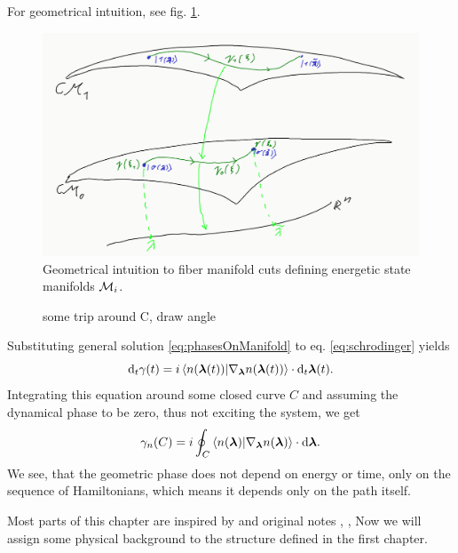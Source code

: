 For geometrical intuition, see fig. \ref{fig:manifoldCutIntuition}.

\begin{figure}[h]
    \centering
    \includegraphics[width=\textwidth]{../img/manifoldCutIntuition.png}
\caption{Geometrical intuition to fiber manifold cuts defining energetic state manifolds $\mathcal{M}_i$.}
    \label{fig:manifoldCutIntuition}
\end{figure}




\begin{figure}[h]
    \centering
\caption{some trip around C, draw angle}
    \label{fig:parallelTransportClosed}
\end{figure}

Substituting general solution \ref{eq:phasesOnManifold} to eq. \ref{eq:schrodinger} yields
\begin{equation}
    \mathrm{d}_t \gamma(t)=i\braket{n({\bm\lambda}(t))|\nabla_{\bm\lambda} n({\bm\lambda}(t))}\cdot \mathrm{d}_t {\bm\lambda}(t).
\end{equation}
Integrating this equation around some closed curve $C$ and assuming the dynamical phase to be zero, thus not exciting the system, we get
\begin{equation}
    \gamma_n(C)=i\oint_C\braket{n({\bm\lambda})|\nabla_{\bm\lambda} n({\bm\lambda})}\cdot \mathrm{d} {\bm\lambda}.
    \label{eq:gammaCoint}
\end{equation}
We see, that the geometric phase does not depend on energy or time, only on the sequence of Hamiltonians, which means it depends only on the path itself.




Most parts of this chapter are inspired by \citep{kolodrubez} and original notes \citep{berry1984}, \citep{berry1989}, \citep{berry2009}
Now we will assign some physical background to the structure defined in the first chapter.

